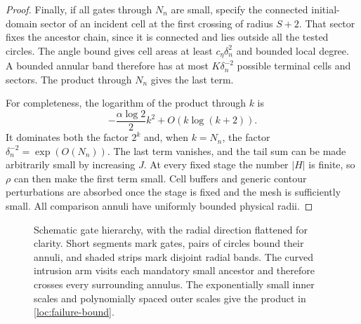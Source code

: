 \begin{proof}
Finally, if all gates through \(N_n\) are small,
specify the connected initial-domain sector of an incident
cell at the first crossing of radius \(S+2\).
That sector fixes the ancestor chain, since it is connected
and lies outside all the tested circles. The angle bound
gives cell areas at least \(c_\eta\delta_n^2\)
and bounded local degree. A bounded annular band
therefore has at most \(K\delta_n^{-2}\)
possible terminal cells and sectors. The product
through \(N_n\) gives the last term.

For completeness, the logarithm of the product
through \(k\) is
\[
 -\frac{\alpha\log2}{2}k^2+O(k\log(k+2)).
 \]
It dominates both the factor \(2^k\) and,
when \(k=N_n\), the factor
\(\delta_n^{-2}=\exp(O(N_n))\).
The last term vanishes, and the tail sum can be
made arbitrarily small by increasing \(J\).
At every fixed stage the number \(|H|\) is finite,
so \(\rho\) can then make the first term small.
Cell buffers and generic contour perturbations
are absorbed once the stage is fixed and the
mesh is sufficiently small. All comparison
annuli have uniformly bounded physical radii.
\end{proof}

\begin{figure}[tb]
\centering
{}
\caption{Schematic gate hierarchy, with the radial direction
flattened for clarity. Short segments mark gates, pairs of circles
bound their annuli, and shaded strips mark disjoint radial bands.
The curved intrusion arm visits each mandatory
small ancestor and therefore crosses every surrounding annulus.
The exponentially small inner scales and polynomially spaced
outer scales give the product in \eqref{loc:failure-bound}.}
\label{loc:fig-gates}
\end{figure}
\FloatBarrier

